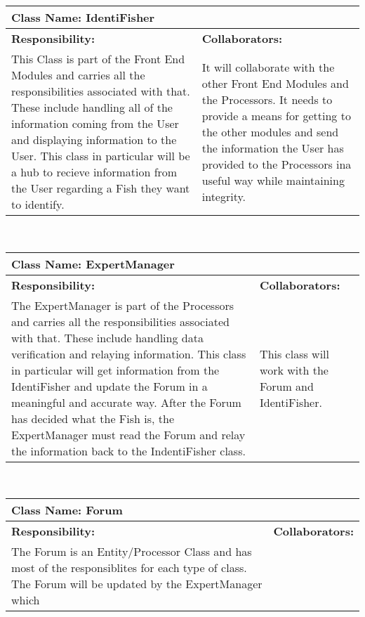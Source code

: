 \documentclass[]{article}
\begin{document}
	\begin{table}[ht]
		\centering
		\begin{tabular}{|p{5cm}|p{5cm}|}
		\hline 
		 \multicolumn{2}{|l|}{\textbf{Class Name: IdentiFisher}} \\
		\hline
		\textbf{Responsibility:} & \textbf{Collaborators:} \\ \hline
		This Class is part of the Front End Modules and carries all the responsibilities associated with that. These include handling all of the information coming from the User and displaying information to the User. This class in particular will be a hub to recieve information from the User regarding a Fish they want to identify. & It will collaborate with the other Front End Modules and the Processors. It needs to provide a means for getting to the other modules and send the information the User has provided to the Processors ina useful way while maintaining integrity. \\
		\hline
		\end{tabular}
	\end{table}~\\
	
	\begin{table}[ht]
		\centering
		\begin{tabular}{|p{5cm}|p{5cm}|}
		\hline 
		 \multicolumn{2}{|l|}{\textbf{Class Name: ExpertManager}} \\
		\hline
		\textbf{Responsibility:} & \textbf{Collaborators:} \\ \hline
		The ExpertManager is part of the Processors and carries all the responsibilities associated with that. These include handling data verification and relaying information. This class in particular will get information from the IdentiFisher and update the Forum in a meaningful and accurate way. After the Forum has decided what the Fish is, the ExpertManager must read the Forum and relay the information back to the IndentiFisher class. & This class will work with the Forum and IdentiFisher.\\
		\hline
		\end{tabular}
	\end{table}~\\

	\begin{table}[ht]
		\centering
		\begin{tabular}{|p{5cm}|p{5cm}|}
		\hline 
		 \multicolumn{2}{|l|}{\textbf{Class Name: Forum}} \\
		\hline
		\textbf{Responsibility:} & \textbf{Collaborators:} \\ \hline
		The Forum is an Entity/Processor Class and has most of the responsiblites for each type of class. The Forum will be updated by the ExpertManager which & \\
		\hline
		\end{tabular}
	\end{table}~\\
	\pagebreak
\end{document}
